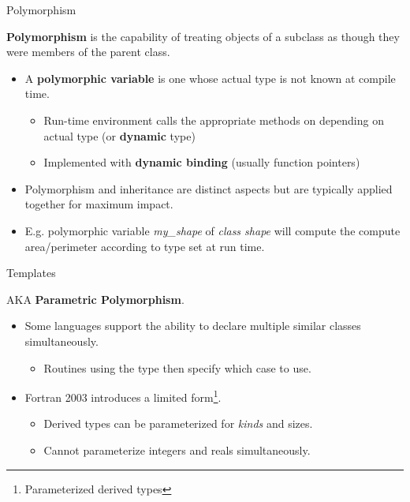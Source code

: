 \documentclass[11pt]{beamer}
\begin{document}
\begin{frame}{Polymorphism}

\textbf{Polymorphism} is the capability of treating objects of a subclass as though they were members of the parent class.
\begin{itemize}

  \item A \textbf{polymorphic variable} is one whose actual type is not known at compile time.
    \begin{itemize}
    \item Run-time environment calls the appropriate methods on depending on actual type (or \textbf{dynamic} type)
    \item Implemented with \textbf{dynamic binding} (usually function pointers)
    \end{itemize}

  \item Polymorphism and inheritance are distinct aspects but are typically applied together for maximum impact.
  \item E.g. polymorphic variable \emph{my\_shape} of \emph{class shape} will compute the compute area/perimeter according to type set at run time.
  
 \end{itemize}

\end{frame}




\begin{frame}{Templates}

AKA \textbf{Parametric Polymorphism}.
\begin{itemize}

  \item Some languages support the ability to declare multiple similar classes simultaneously.
    \begin{itemize}
    \item Routines using the type then specify which case to use.
    \end{itemize}

  \item Fortran 2003 introduces a limited form\footnote{Parameterized derived types}.
    \begin{itemize}
    \item Derived types can be parameterized for \emph{kinds} and sizes.
    \item Cannot parameterize integers and reals simultaneously.
    \end{itemize}
  
 \end{itemize}

\end{frame}
\end{document}
